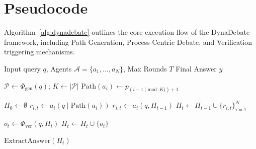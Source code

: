 \section{Pseudocode}
\label{app:pseudocode}

Algorithm~\ref{alg:dynadebate} outlines the core execution flow of the DynaDebate framework, including Path Generation, Process-Centric Debate, and Verification triggering mechanisms.

\begin{algorithm}[t]
\caption{DynaDebate Framework for Multi-Agent Reasoning}
\label{alg:dynadebate}
\begin{algorithmic}[1]
\Require Input query $q$, Agents $\mathcal{A} = \{a_1, \dots, a_N\}$, Max Rounds $T$
\Ensure Final Answer $y$

\State $\mathcal{P} \leftarrow \Phi_{\text{gen}}(q)$; \quad $K \leftarrow |\mathcal{P}|$
    \State $\text{Path}(a_i) \leftarrow p_{(i-1 \pmod K) + 1}$
\EndFor

\State $H_0 \leftarrow \emptyset$
            \State $r_{i,t} \leftarrow a_i(q \mid \text{Path}(a_i))$
        \Else
            \State $r_{i,t} \leftarrow a_i(q, H_{t-1})$
        \EndIf
    \EndFor
    \State $H_t \leftarrow H_{t-1} \cup \{r_{i,t}\}_{i=1}^N$

        \State $o_t \leftarrow \Phi_{\text{ver}}(q, H_t)$
        \State $H_t \leftarrow H_t \cup \{o_t\}$
    \EndIf

\EndFor
\State \Return $\text{ExtractAnswer}(H_t)$
\end{algorithmic}
\end{algorithm}
